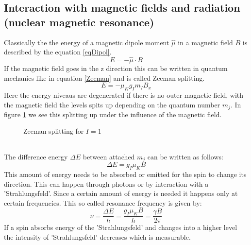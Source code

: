 \subsection{Interaction with magnetic fields and radiation (nuclear magnetic resonance)}
Classically the the energy of a magnetic dipole moment $\hat{\mu}$ in a magnetic field $B$ is described by the equation \ref{eqDipol}.
\begin{equation}
E=-\hat{\mu}\cdot B
\label{eqDipol}
\end{equation}
If the magnetic field goes in the z direction this can be written in quantum mechanics like in equation \ref{Zeeman} and is called Zeeman-splitting. 
\begin{equation}
E = - \mu_K g_I m_I B_x
\label{Zeeman}
\end{equation}
Here the energy niveaus are degenerated if there is no outer magnetic field, with the magnetic field the levels spits up depending on the quantum number $m_j$. In figure \ref{ZeemanBild} we see this splitting up under the influence of the magnetic field. 
\begin{figure}[h]
	\centering
	\caption[Zeeman Splitting]{Zeeman splitting for $I=1$}
	\label{ZeemanBild}
\end{figure}\\
The difference energy $\Delta E$ between attached $m_j$ can be written as follows:
\begin{equation}
\Delta E = g_I \mu_K B
\end{equation}   
This amount of energy needs to be absorbed or emitted for the spin to change its direction. This can happen through photons or by interaction with a 'Strahlungsfeld'. Since a certain amount of energy is needed it happens only at certain frequencies. This so called resonance frequency is given by:
\begin{equation}
	\nu = \frac{\Delta E}{h}=\frac{g_I\mu_KB}{h}=\frac{\gamma B}{2\pi}	
\end{equation}
If a spin absorbs energy of the 'Strahlungsfeld' and changes into a higher level the intensity of 'Strahlungsfeld' decreases which is measurable. 
